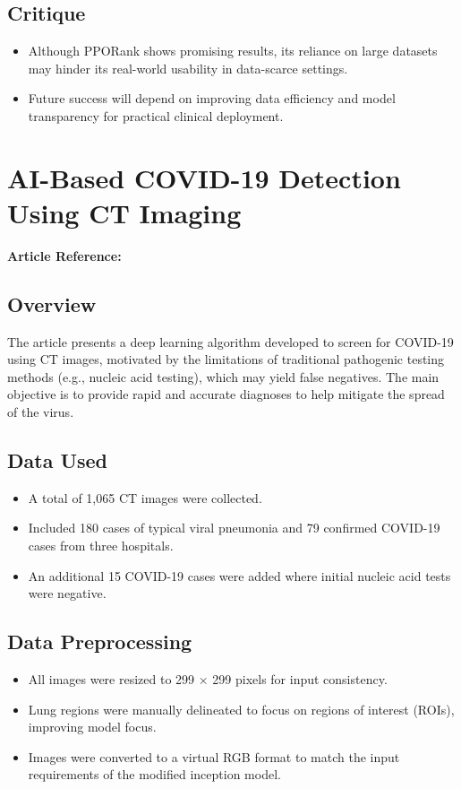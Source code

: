 \subsection*{Critique}
\begin{itemize}
    \item Although PPORank shows promising results, its reliance on large datasets may hinder its real-world usability in data-scarce settings.
    \item Future success will depend on improving data efficiency and model transparency for practical clinical deployment.
\end{itemize}

\section{AI-Based COVID-19 Detection Using CT Imaging}
\textbf{Article Reference:} \cite{article_20}

\subsection*{Overview}
The article presents a deep learning algorithm developed to screen for COVID-19 using CT images, motivated by the limitations of traditional pathogenic testing methods (e.g., nucleic acid testing), which may yield false negatives. The main objective is to provide rapid and accurate diagnoses to help mitigate the spread of the virus.

\subsection*{Data Used}
\begin{itemize}
    \item A total of 1,065 CT images were collected.
    \item Included 180 cases of typical viral pneumonia and 79 confirmed COVID-19 cases from three hospitals.
    \item An additional 15 COVID-19 cases were added where initial nucleic acid tests were negative.
\end{itemize}

\subsection*{Data Preprocessing}
\begin{itemize}
    \item All images were resized to 299 × 299 pixels for input consistency.
    \item Lung regions were manually delineated to focus on regions of interest (ROIs), improving model focus.
    \item Images were converted to a virtual RGB format to match the input requirements of the modified inception model.
\end{itemize}

